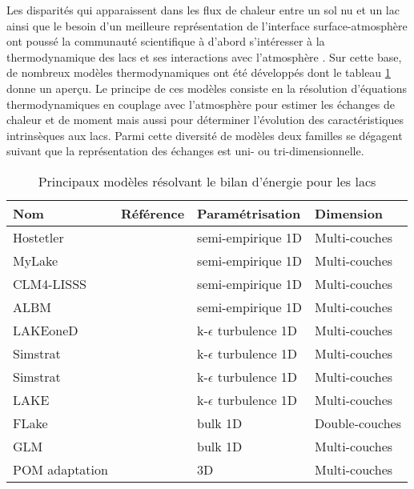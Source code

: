 Les disparités qui apparaissent dans les flux de chaleur entre un sol nu et un lac ainsi que le besoin d'un meilleure représentation de l'interface surface-atmosphère ont poussé la communauté scientifique à d'abord s'intéresser à la thermodynamique des lacs et ses interactions avec l'atmosphère \citep{hostetler1993,goyette2000}. Sur cette base, de nombreux modèles thermodynamiques ont été développés dont le tableau \ref{tab_thermo} donne un aperçu. Le principe de ces modèles consiste en la résolution d'équations thermodynamiques en couplage avec l'atmosphère pour estimer les échanges de chaleur et de moment mais aussi pour déterminer l'évolution des caractéristiques intrinsèques aux lacs. Parmi cette diversité de modèles deux familles se dégagent suivant que la représentation des échanges est uni- ou tri-dimensionnelle. 

\begin{table}[h!]
 \caption{Principaux modèles résolvant le bilan d'énergie pour les lacs}
 \label{tab_thermo}
 \begin{tabularx}{\textwidth}{XcXX}
 \hline
 Nom & Référence & Paramétrisation &  Dimension\\
 \hline
  Hostetler&\citet{hostetler1993}&semi-empirique 1D&Multi-couches\\
  MyLake&\citet{saloranta2007}&semi-empirique 1D&Multi-couches\\
  CLM4-LISSS&\citet{subin2012}&semi-empirique 1D&Multi-couches\\
  ALBM&\citet{tan2015}&semi-empirique 1D&Multi-couches\\
  LAKEoneD&\citet{joehnk2001}&k-$\epsilon$ turbulence 1D&Multi-couches\\
  Simstrat&\citet{goudsmit2002}&k-$\epsilon$ turbulence 1D&Multi-couches\\
  Simstrat&\citet{goudsmit2002}&k-$\epsilon$ turbulence 1D&Multi-couches\\
  LAKE&\citet{stepanenko2016}&k-$\epsilon$ turbulence 1D&Multi-couches\\
  FLake& \citet{mironov2008} &bulk 1D&Double-couches\\
  GLM&\citet{hipsey2019}&bulk 1D&Multi-couches\\
  POM adaptation&\citet{song2004}&3D&Multi-couches\\ 
  \hline
 \end{tabularx}
\end{table}

